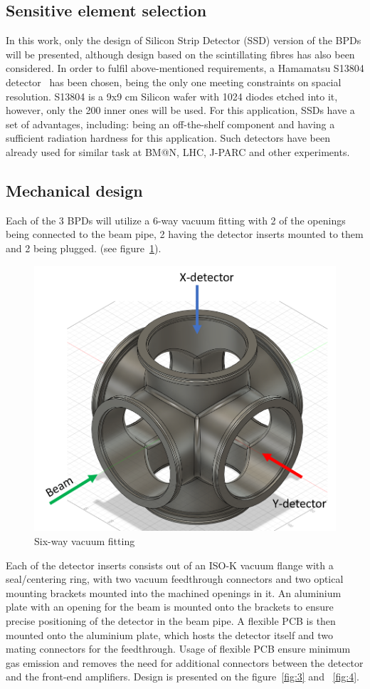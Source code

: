 \documentclass[a4paper]{jpconf}
\begin{document}
\subsection{Sensitive element selection}
In this work, only the design of Silicon Strip Detector (SSD) version of the BPDs will be presented, although design based on the scintillating fibres has also been considered.
In order to fulfil above-mentioned requirements, a Hamamatsu S13804 detector~\cite{Hamamatsu_det} has been chosen, being the only one meeting constraints on spacial resolution. S13804 is a 9x9 cm Silicon wafer with 1024 diodes etched into it, however, only the 200 inner ones will be used.
For this application, SSDs have a set of advantages, including: being an off-the-shelf component and having a sufficient radiation hardness for this application. Such detectors have been already used for similar task at BM@N, LHC, J-PARC and other experiments.

\subsection{Mechanical design}
Each of the 3 BPDs will utilize a 6-way vacuum fitting with 2 of the openings being connected to the beam pipe, 2 having the detector inserts mounted to them and 2 being plugged. (see figure~\ref{fig:2}).

\begin{figure}[htbp]
	\centering
	\includegraphics[width=.4\textwidth]{6_way_fitting.png}
	\caption{\label{fig:2} Six-way vacuum fitting}
\end{figure}

Each of the detector inserts consists out of an ISO-K vacuum flange with a seal/centering ring, with two vacuum feedthrough connectors and two optical mounting brackets mounted into the machined openings in it. An aluminium plate with an opening for the beam is mounted onto the brackets to ensure precise positioning of the detector in the beam pipe. A flexible PCB is then mounted onto the aluminium plate, which hosts the detector itself and two mating connectors for the feedthrough. Usage of flexible PCB ensure minimum gas emission and removes the need for additional connectors between the detector and the front-end amplifiers. Design is presented on the figure~\ref{fig:3} and ~\ref{fig:4}.
\end{document}
